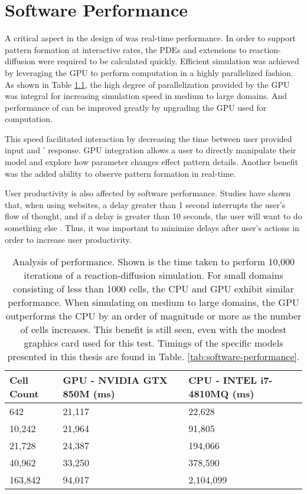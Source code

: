 \chapter{Software Performance}
A critical aspect in the design of \ProgramName{} was real-time performance. In order to support pattern formation at interactive rates, the PDEs and extensions to reaction-diffusion were required to be calculated quickly. Efficient simulation was achieved by leveraging the GPU to perform computation in a highly parallelized fashion. As shown in Table \ref{tab:perf}, the high degree of parallelization provided by the GPU was integral for increasing simulation speed in medium to large domains.   And performance of \ProgramName{} can be improved greatly by upgrading the GPU used for computation.

This speed facilitated interaction by decreasing the time between user provided input and \ProgramName{}' response. GPU integration allows a user to directly manipulate their model and explore how parameter changes effect pattern details. Another benefit was the added ability to observe pattern formation in real-time.

User productivity is also affected by software performance. Studies have shown that, when using websites, a delay greater than 1 second interrupts the user's flow of thought, and if a delay is greater than 10 seconds, the user will want to do something else \citep{nielsen1994}. Thus, it was important to minimize delays after user's actions in order to increase user productivity.

\begin{table}[p]
	\centering
	\begin{tabular}{lll} \hline
	Cell Count & GPU - NVIDIA GTX 850M (ms)    & CPU - INTEL i7-4810MQ (ms)\\ \hline
	642      & 21,117 & 22,628    \\
	10,242   & 21,964 & 91,805    \\
	21,728   & 24,387 & 194,066   \\
	40,962   & 33,250 & 378,590   \\
	163,842  & 94,017 & 2,104,099 \\ \hline 
	\end{tabular}
	\caption[Analysis of \ProgramName{} performance]{Analysis of \ProgramName{} performance. Shown is the time taken to perform 10,000 iterations of a reaction-diffusion simulation. For small domains consisting of less than 1000 cells, the CPU and GPU exhibit similar performance. When simulating on medium to large domains, the GPU outperforms the CPU by an order of magnitude or more as the number of cells increases. This benefit is still seen, even with the modest graphics card used for this test. Timings of the specific models presented in this thesis are found in Table. \ref{tab:software-performance}.}
	\label{tab:perf}
\end{table}
